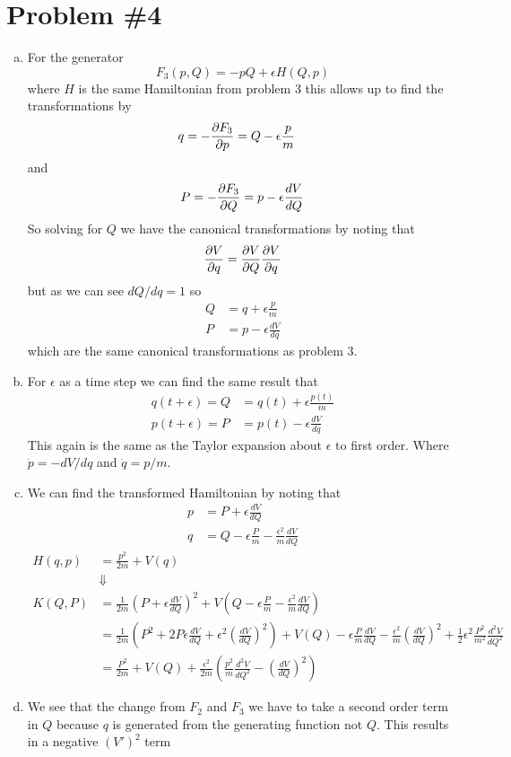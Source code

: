 \documentclass[11pt]{article}
\numberwithin{equation}{section}
\begin{document}
\section{Problem \#4}
\begin{enumerate}[(a)]
\item For the generator 
$$F_3(p,Q) = -pQ + \epsilon{H(Q,p)}$$
where $H$ is the same Hamiltonian from problem 3 this allows up to find the transformations 
by
\begin{align*}
q = -\frac{\partial{F_3}}{\partial{p}} &= Q - \epsilon\frac{p}{m}
\end{align*}
and 
$$P = -\frac{\partial{F_3}}{\partial{Q}} = p - \epsilon\frac{dV}{dQ}$$
So solving for $Q$ we have the canonical transformations by noting that
$$\frac{\partial{V}}{\partial{q}} = \frac{\partial{V}}{\partial{Q}}\frac{\partial{V}}{\partial{q}}$$
but as we can see $dQ/dq =1$ so
\begin{align*}
Q &= q + \epsilon\frac{p}{m}\\
P &= p - \epsilon\frac{dV}{dq}
\end{align*}
which are the same canonical transformations as problem 3.

\item For $\epsilon$ as a time step we can find the same result that
\begin{align*}
q(t+\epsilon) = Q &= q(t) + \epsilon\frac{p(t)}{m}\\
p(t+\epsilon) = P &= p(t) - \epsilon\frac{dV}{dq}
\end{align*}
This again is the same as the Taylor expansion about $\epsilon$ to first order. Where 
$\dot{p} = -dV/dq$ and $\dot{q} = p/m$.

\item We can find the transformed Hamiltonian by noting that
\begin{align*} 
p &= P + \epsilon\frac{dV}{dQ}\\
q &= Q - \epsilon\frac{P}{m} - \frac{\epsilon^2}{m}\frac{dV}{dQ}
\end{align*} 
\begin{align*}
H(q,p) &= \frac{p^2}{2m} + V(q)\\
&\Downarrow\\
K(Q,P) &= \frac{1}{2m}\left(P+\epsilon\frac{dV}{dQ}\right)^2 + V\left(Q-\epsilon\frac{P}{m} - \frac{\epsilon^2}{m}\frac{dV}{dQ}\right)\\
&= \frac{1}{2m}\left(P^2+2P\epsilon\frac{dV}{dQ}+\epsilon^2\left(\frac{dV}{dQ}\right)^2\right) + V(Q) - \epsilon\frac{P}{m}\frac{dV}{dQ} - \frac{\epsilon^2}{m}\left(\frac{dV}{dQ}\right)^2 + \frac{1}{2}\epsilon^2\frac{P^2}{m^2}\frac{d^2V}{dQ^2}\\
&= \frac{P^2}{2m} + V(Q) +\frac{\epsilon^2}{2m}\left(\frac{p^2}{m}\frac{d^2V}{dQ^2}-\left(\frac{dV}{dQ}\right)^2 \right)
\end{align*}

\item We see that the change from $F_2$ and $F_3$ we have to take a second order term in $Q$
because $q$ is generated from the generating function not $Q$. This results in a negative 
$(V')^2$ term



\end{enumerate}
\end{document}
